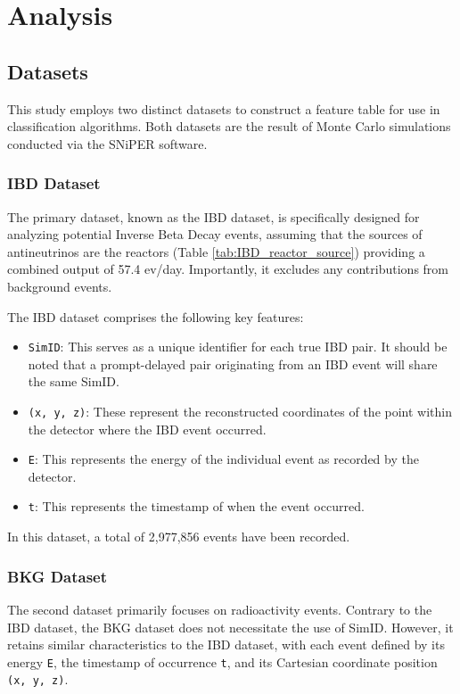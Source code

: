 \chapter{Analysis}

\section{Datasets}
This study employs two distinct datasets to construct a feature table for use in classification algorithms. Both datasets are the result of Monte Carlo simulations conducted via the SNiPER software.

\subsection*{IBD Dataset}
The primary dataset, known as the IBD dataset, is specifically designed for analyzing potential Inverse Beta Decay events, assuming that the sources of antineutrinos are the reactors (Table \ref{tab:IBD_reactor_source}) providing a combined output of 57.4 ev/day. Importantly, it excludes any contributions from background events.

The IBD dataset comprises the following key features:

\begin{small}
\begin{itemize}
	\item \texttt{SimID}: This serves as a unique identifier for each true IBD pair. It should be noted that a prompt-delayed pair originating from an IBD event will share the same SimID.
	\item \texttt{(x, y, z)}: These represent the reconstructed coordinates of the point within the detector where the IBD event occurred.
	\item \texttt{E}: This represents the energy of the individual event as recorded by the detector.
	\item \texttt{t}: This represents the timestamp of when the event occurred.
\end{itemize}
\end{small}

In this dataset, a total of 2,977,856 events have been recorded.

\subsection*{BKG Dataset}

The second dataset primarily focuses on radioactivity events. Contrary to the IBD dataset, the BKG dataset does not necessitate the use of SimID. However, it retains similar characteristics to the IBD dataset, with each event defined by its energy \texttt{E}, the timestamp of occurrence \texttt{t}, and its Cartesian coordinate position \texttt{(x, y, z)}.

